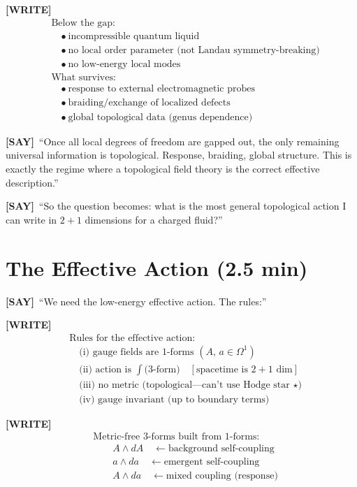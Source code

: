 \documentclass[11pt]{article}
\newcommand{\WRITE}{\textcolor{writecol}{\textbf{[WRITE]}}}
\newcommand{\SAY}{\textcolor{saycol}{\textbf{[SAY]}}}
\begin{document}
\WRITE
\begin{align*}
&\text{Below the gap:}\\
&\quad\bullet\ \text{incompressible quantum liquid}\\
&\quad\bullet\ \text{no local order parameter (not Landau symmetry-breaking)}\\
&\quad\bullet\ \text{no low-energy local modes}\\[8pt]
&\text{What survives:}\\
&\quad\bullet\ \text{response to external electromagnetic probes}\\
&\quad\bullet\ \text{braiding/exchange of localized defects}\\
&\quad\bullet\ \text{global topological data (genus dependence)}
\end{align*}

\SAY\ ``Once all local degrees of freedom are gapped out, the only remaining universal information is topological. Response, braiding, global structure. This is exactly the regime where a topological field theory is the correct effective description.''

\SAY\ ``So the question becomes: what is the most general topological action I can write in $2+1$ dimensions for a charged fluid?''

\section{The Effective Action (2.5 min)}

\SAY\ ``We need the low-energy effective action. The rules:''

\WRITE
\begin{align*}
&\text{Rules for the effective action:}\\
&\quad\text{(i) gauge fields are 1-forms } (A,\,a\in\Omega^1)\\
&\quad\text{(ii) action is } \textstyle\int\text{(3-form)}\quad [\text{spacetime is }2{+}1\text{ dim}]\\
&\quad\text{(iii) no metric (topological---can't use Hodge star }\star\text{)}\\
&\quad\text{(iv) gauge invariant (up to boundary terms)}
\end{align*}

\WRITE
\begin{align*}
&\text{Metric-free 3-forms built from 1-forms:}\\[4pt]
&\qquad A\wedge dA \quad\leftarrow\text{background self-coupling}\\
&\qquad a\wedge da \quad\leftarrow\text{emergent self-coupling}\\
&\qquad A\wedge da \quad\leftarrow\text{mixed coupling (response)}
\end{align*}
\end{document}
